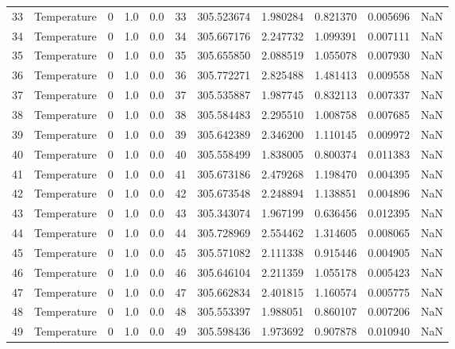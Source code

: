\begin{tabular}{llrrrrrrrrr}
33  &  Temperature &       0 &  1.0 &  0.0 &   33 &  305.523674 &  1.980284 &  0.821370 &   0.005696 &      NaN \\
34  &  Temperature &       0 &  1.0 &  0.0 &   34 &  305.667176 &  2.247732 &  1.099391 &   0.007111 &      NaN \\
35  &  Temperature &       0 &  1.0 &  0.0 &   35 &  305.655850 &  2.088519 &  1.055078 &   0.007930 &      NaN \\
36  &  Temperature &       0 &  1.0 &  0.0 &   36 &  305.772271 &  2.825488 &  1.481413 &   0.009558 &      NaN \\
37  &  Temperature &       0 &  1.0 &  0.0 &   37 &  305.535887 &  1.987745 &  0.832113 &   0.007337 &      NaN \\
38  &  Temperature &       0 &  1.0 &  0.0 &   38 &  305.584483 &  2.295510 &  1.008758 &   0.007685 &      NaN \\
39  &  Temperature &       0 &  1.0 &  0.0 &   39 &  305.642389 &  2.346200 &  1.110145 &   0.009972 &      NaN \\
40  &  Temperature &       0 &  1.0 &  0.0 &   40 &  305.558499 &  1.838005 &  0.800374 &   0.011383 &      NaN \\
41  &  Temperature &       0 &  1.0 &  0.0 &   41 &  305.673186 &  2.479268 &  1.198470 &   0.004395 &      NaN \\
42  &  Temperature &       0 &  1.0 &  0.0 &   42 &  305.673548 &  2.248894 &  1.138851 &   0.004896 &      NaN \\
43  &  Temperature &       0 &  1.0 &  0.0 &   43 &  305.343074 &  1.967199 &  0.636456 &   0.012395 &      NaN \\
44  &  Temperature &       0 &  1.0 &  0.0 &   44 &  305.728969 &  2.554462 &  1.314605 &   0.008065 &      NaN \\
45  &  Temperature &       0 &  1.0 &  0.0 &   45 &  305.571082 &  2.111338 &  0.915446 &   0.004905 &      NaN \\
46  &  Temperature &       0 &  1.0 &  0.0 &   46 &  305.646104 &  2.211359 &  1.055178 &   0.005423 &      NaN \\
47  &  Temperature &       0 &  1.0 &  0.0 &   47 &  305.662834 &  2.401815 &  1.160574 &   0.005775 &      NaN \\
48  &  Temperature &       0 &  1.0 &  0.0 &   48 &  305.553397 &  1.988051 &  0.860107 &   0.007206 &      NaN \\
49  &  Temperature &       0 &  1.0 &  0.0 &   49 &  305.598436 &  1.973692 &  0.907878 &   0.010940 &      NaN \\

\end{tabular}
